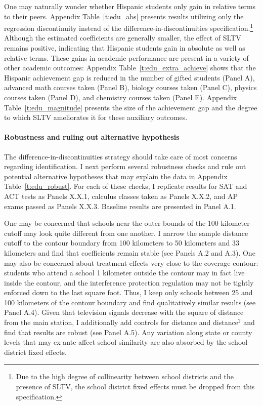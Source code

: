 \documentclass[11pt]{article}
\begin{document}
One may naturally wonder whether Hispanic students only gain in relative terms to their peers. Appendix Table~\ref{t:edu_abs} presents results utilizing only the regression discontinuity instead of the difference-in-discontinuities specification.\footnote{ Due to the high degree of collinearity between school districts and the presence of SLTV, the school district fixed effects must be dropped from this specification.}  Although the estimated coefficients are generally smaller, the effect of SLTV remains positive, indicating that Hispanic students gain in absolute as well as relative terms. These gains in academic performance are present in a variety of other academic outcomes: Appendix Table~\ref{t:edu_extra_achieve} shows that the Hispanic achievement gap is reduced in the number of gifted students (Panel A), advanced math courses taken (Panel B), biology courses taken (Panel C), physics courses taken (Panel D), and chemistry courses taken (Panel E). Appendix Table~\ref{t:edu_magnitude} presents the size of the achievement gap and the degree to which SLTV ameliorates it for these auxiliary outcomes.


\paragraph{Robustness and ruling out alternative hypothesis}

The difference-in-discontinuities strategy should take care of most concerns regarding identification. I next perform several robustness checks and rule out potential alternative hypotheses that may explain the data in Appendix Table~\ref{t:edu_robust}. For each of these checks, I replicate results for SAT and ACT tests as Panels X.X.1, calculus classes taken as Panels X.X.2, and AP exams passed as Panels X.X.3. Baseline results are presented in Panel A.1.

One may be concerned that schools near the outer bounds of the 100 kilometer cutoff may look quite different from one another. I narrow the sample distance cutoff to the contour boundary from 100 kilometers to 50 kilometers and 33 kilometers and find that coefficients remain stable (see Panels A.2 and A.3). One may also be concerned about treatment effects very close to the coverage contour: students who attend a school 1 kilometer outside the contour may in fact live inside the contour, and the interference protection regulation may not be tightly enforced down to the last square foot. Thus, I keep only schools between 25 and 100 kilometers of the contour boundary and find qualitatively similar results (see Panel A.4). Given that television signals decrease with the square of distance from the main station, I additionally add controls for distance and distance$^2$ and find that results are robust (see Panel A.5). Any variation along state or county levels that may ex ante affect school similarity are also absorbed by the school district fixed effects. 
\end{document}
